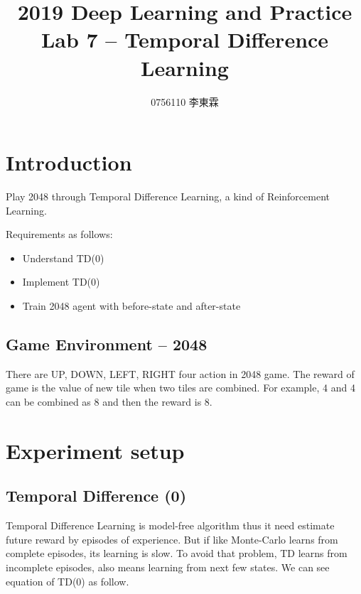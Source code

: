 \documentclass[12pt]{article}
\begin{document}
 
 
\title{2019 Deep Learning and Practice \\ Lab 7 -- Temporal Difference Learning}
\author{0756110 李東霖}

\maketitle
\section{Introduction}

Play 2048 through Temporal Difference Learning, a kind of Reinforcement Learning.

Requirements as follows:

\begin{itemize}
    \item Understand TD(0)
    \item Implement TD(0)
    \item Train 2048 agent with before-state and after-state
\end{itemize}

\subsection{Game Environment -- 2048}

There are UP, DOWN, LEFT, RIGHT four action in 2048 game. The reward of game is the value of new tile when two tiles are combined. For example, 4 and 4 can be combined as 8 and then the reward is 8.

\section{Experiment setup}

\subsection{Temporal Difference (0)}

Temporal Difference Learning is model-free algorithm thus it need estimate future reward by episodes of experience. But if like Monte-Carlo learns from complete episodes, its learning is slow. To avoid that problem, TD learns from incomplete episodes, also means learning from next few states. We can see equation of TD(0) as follow.
\end{document}
